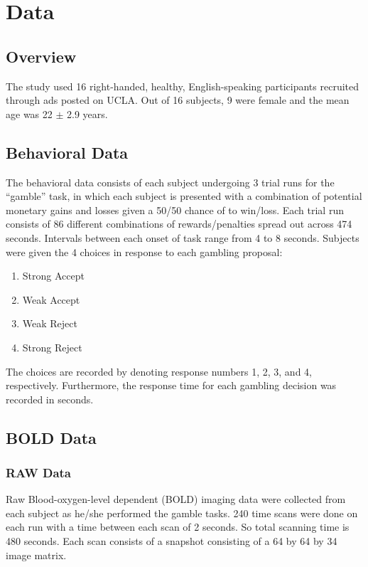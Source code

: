 \documentclass[11pt]{article}
\begin{document}
\section{Data}
\subsection{Overview}
The study used 16 right-handed, healthy, English-speaking participants 
recruited through ads posted on UCLA. Out of 16 subjects, 9 were female and 
the mean age was 22 $ \pm $ 2.9 years. 

\subsection{Behavioral Data}
The behavioral data consists of each subject undergoing 3 trial runs for the 
``gamble'' task, in which each subject is presented with a combination of 
potential monetary gains and losses given a 50/50 chance of to win/loss. Each 
trial run consists of 86 different combinations of rewards/penalties spread 
out across 474 seconds. Intervals between each onset of task range from 4 to 
8 seconds. Subjects were given the 4 choices in response to each gambling 
proposal:
\begin{enumerate}
  \item Strong Accept
  \item Weak Accept
  \item Weak Reject
  \item Strong Reject
\end{enumerate}
The choices are recorded by denoting response numbers 1, 2, 3, and 4, 
respectively. Furthermore, the response time for each gambling decision was 
recorded in seconds. 
\subsection{BOLD Data}
\subsubsection{RAW Data}
Raw Blood-oxygen-level dependent (BOLD) imaging data were collected from each
subject as he/she performed the gamble tasks. 240 time scans were done on each
run with a time between each scan of 2 seconds. So total scanning time is 480
seconds. Each scan consists of a snapshot consisting of a 64 by 64 by 34 image
matrix.
\end{document}
